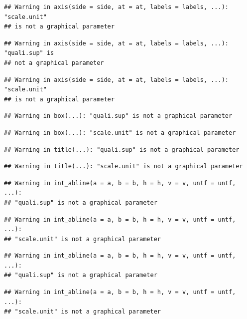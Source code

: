 \documentclass[]{article}
\begin{document}
\begin{verbatim}
## Warning in axis(side = side, at = at, labels = labels, ...): "scale.unit"
## is not a graphical parameter
\end{verbatim}

\begin{verbatim}
## Warning in axis(side = side, at = at, labels = labels, ...): "quali.sup" is
## not a graphical parameter
\end{verbatim}

\begin{verbatim}
## Warning in axis(side = side, at = at, labels = labels, ...): "scale.unit"
## is not a graphical parameter
\end{verbatim}

\begin{verbatim}
## Warning in box(...): "quali.sup" is not a graphical parameter
\end{verbatim}

\begin{verbatim}
## Warning in box(...): "scale.unit" is not a graphical parameter
\end{verbatim}

\begin{verbatim}
## Warning in title(...): "quali.sup" is not a graphical parameter
\end{verbatim}

\begin{verbatim}
## Warning in title(...): "scale.unit" is not a graphical parameter
\end{verbatim}

\begin{verbatim}
## Warning in int_abline(a = a, b = b, h = h, v = v, untf = untf, ...):
## "quali.sup" is not a graphical parameter
\end{verbatim}

\begin{verbatim}
## Warning in int_abline(a = a, b = b, h = h, v = v, untf = untf, ...):
## "scale.unit" is not a graphical parameter
\end{verbatim}

\begin{verbatim}
## Warning in int_abline(a = a, b = b, h = h, v = v, untf = untf, ...):
## "quali.sup" is not a graphical parameter
\end{verbatim}

\begin{verbatim}
## Warning in int_abline(a = a, b = b, h = h, v = v, untf = untf, ...):
## "scale.unit" is not a graphical parameter
\end{verbatim}
\end{document}
